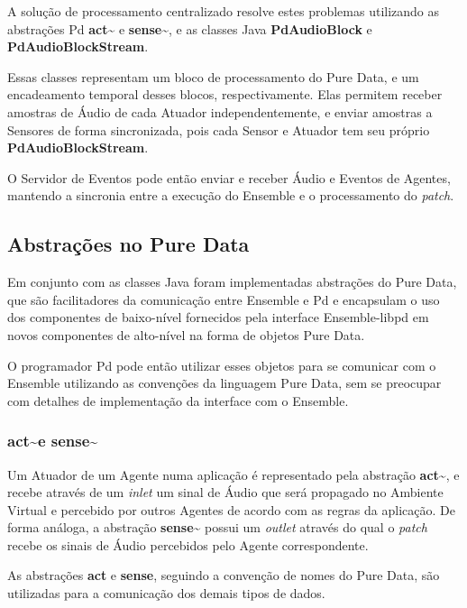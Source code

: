 \documentclass[a4paper, 11pt, twoside]{article}
\begin{document}
\begin{multicols}{2}
A solução de processamento centralizado resolve estes problemas utilizando
as abstrações Pd \textbf{act\textasciitilde} e \textbf{sense\textasciitilde},
e as classes Java \textbf{PdAudioBlock} e \textbf{PdAudioBlockStream}.

Essas classes representam um bloco de processamento do Pure Data, e um
encadeamento temporal desses blocos, respectivamente. Elas permitem
receber amostras de Áudio de cada Atuador independentemente, e enviar
amostras a Sensores de forma sincronizada, pois cada Sensor e Atuador
tem seu próprio \textbf{PdAudioBlockStream}.

O Servidor de Eventos pode então enviar e receber Áudio e Eventos de Agentes,
mantendo a sincronia entre a execução do Ensemble e o processamento 
do \textit{patch}.

\subsection{Abstrações no Pure Data}

Em conjunto com as classes Java foram implementadas abstrações do
Pure Data, que são facilitadores da comunicação entre Ensemble e Pd
e encapsulam o uso dos componentes de baixo-nível fornecidos pela
interface Ensemble-libpd em  novos componentes de alto-nível
na forma de objetos Pure Data.

O programador Pd pode então utilizar esses objetos para se comunicar
com o Ensemble utilizando as convenções da linguagem Pure Data,
sem se preocupar com detalhes de implementação da interface com o
Ensemble.

\subsubsection{act\textasciitilde e sense\textasciitilde}

Um Atuador de um Agente numa aplicação é representado pela abstração
\textbf{act\textasciitilde}, e recebe através de um \textit{inlet} 
um sinal de Áudio que será propagado no Ambiente 
Virtual e percebido por outros Agentes de acordo com as regras da aplicação. 
De forma análoga, a abstração \textbf{sense\textasciitilde} possui um 
\textit{outlet} através do qual o \textit{patch} recebe os sinais de Áudio 
percebidos pelo Agente correspondente.

As abstrações \textbf{act} e \textbf{sense}, seguindo a convenção de nomes do
Pure Data, são utilizadas para a comunicação dos demais tipos de dados.


\end{multicols}
\end{document}
